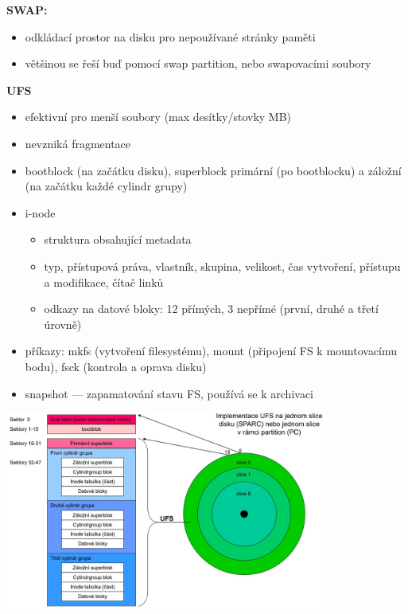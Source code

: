 \textbf{SWAP:}
\begin{itemize}
    \item odkládací prostor na disku pro nepoužívané stránky paměti
    \item většinou se řeší buď pomocí swap partition, nebo swapovacími soubory
\end{itemize}

\textbf{UFS}
\begin{itemize}
    \item efektivní pro menší soubory (max desítky/stovky MB)
    \item nevzniká fragmentace
    \item bootblock (na začátku disku), superblock primární (po bootblocku) a záložní (na začátku každé cylindr grupy)
    \item i-node
    \begin{itemize}
        \item struktura obsahující metadata
        \item typ, přístupová práva, vlastník, skupina, velikost, čas vytvoření, přístupu a modifikace, čítač linků
        \item odkazy na datové bloky: 12 přímých, 3 nepřímé (první, druhé a třetí úrovně)
    \end{itemize}
    \item příkazy: mkfs (vytvoření filesystému), mount (připojení FS k mountovacímu bodu), fsck (kontrola a oprava disku)
    \item snapshot --- zapamatování stavu FS, používá se k archivaci
\end{itemize}

\includegraphics[width=0.8\textwidth]{img/OB-2_0.jpg}

